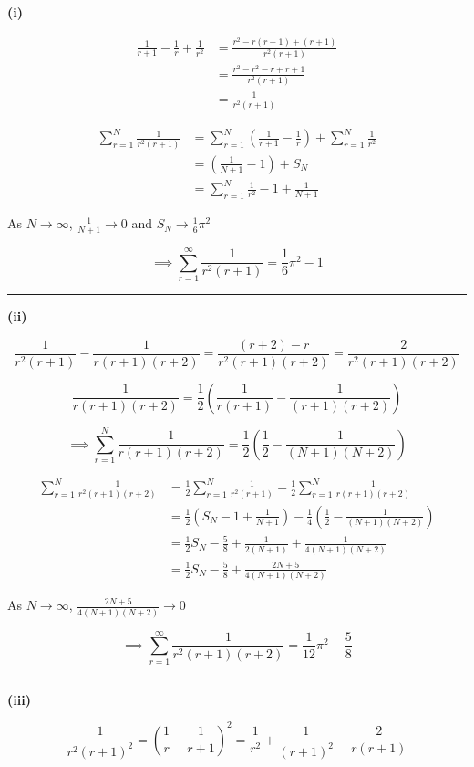 \documentclass[12pt]{article}
\begin{document}
\newcommand{\ds}{\displaystyle}

\textbf{(i)}

\begin{align*}
\frac1{r+1}-\frac1r+\frac1{r^2}
&=\frac{r^2-r(r+1)+(r+1)}{r^2(r+1)}\\
&=\frac{r^2-r^2-r+r+1}{r^2(r+1)}\\
&=\frac1{r^2(r+1)}
\end{align*}

\begin{align*}
\sum_{r=1}^N\frac1{r^2(r+1)}
&=\sum_{r=1}^N\left(\frac1{r+1}-\frac1r\right)+\sum_{r=1}^N\frac1{r^2}\\
&=\left(\frac1{N+1}-1\right)+S_N\\
&=\sum_{r=1}^N\frac1{r^2}-1+\frac1{N+1}
\end{align*}

As $\ds N\to\infty$, $\ds \frac1{N+1}\to0$ and $\ds S_N\to\frac16\pi^2$

$$\implies \boxed{\sum_{r=1}^\infty\frac1{r^2(r+1)}=\frac16\pi^2-1}$$

\bigskip\hrule\bigskip

\textbf{(ii)}

$$\frac1{r^2(r+1)}-\frac1{r(r+1)(r+2)}
=\frac{(r+2)-r}{r^2(r+1)(r+2)}
=\frac2{r^2(r+1)(r+2)}$$

$$\frac1{r(r+1)(r+2)}=\frac12\left(\frac1{r(r+1)}-\frac1{(r+1)(r+2)}\right)$$

$$\implies\sum_{r=1}^N\frac1{r(r+1)(r+2)}
=\frac12\left(\frac12-\frac1{(N+1)(N+2)}\right)$$

\begin{align*}
\sum_{r=1}^N\frac1{r^2(r+1)(r+2)}
&=\frac12\sum_{r=1}^N\frac1{r^2(r+1)}-\frac12\sum_{r=1}^N\frac1{r(r+1)(r+2)}\\
&=\frac12\left(S_N-1+\frac1{N+1}\right)
-\frac14\left(\frac12-\frac1{(N+1)(N+2)}\right)\\
&=\frac12S_N-\frac58+\frac1{2(N+1)}+\frac1{4(N+1)(N+2)}\\
&=\frac12S_N-\frac58+\frac{2N+5}{4(N+1)(N+2)}
\end{align*}

As $\ds N\to\infty$, $\ds \frac{2N+5}{4(N+1)(N+2)}\to0$

$$\implies\boxed{\sum_{r=1}^\infty\frac1{r^2(r+1)(r+2)}=\frac1{12}\pi^2-\frac58}$$

\bigskip\hrule\bigskip

\textbf{(iii)}

$$\frac1{r^2(r+1)^2}=\left(\frac1r-\frac1{r+1}\right)^2
=\frac1{r^2}+\frac1{(r+1)^2}-\frac2{r(r+1)}$$
\end{document}
